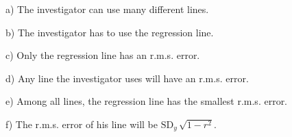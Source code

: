 \documentclass[10pt]{article}
\begin{document}
\hspace{20pt} a) The investigator can use many different lines.
\bigskip
 
\hspace{20pt} b) The investigator has to use the regression line.
\bigskip

\hspace{20pt} c) Only the regression line has an r.m.s. error.
\bigskip

\hspace{20pt} d) Any line the investigator uses will have an r.m.s. error.
\bigskip

\hspace{20pt} e) Among all lines, the regression line has the smallest r.m.s. error.
\bigskip

\hspace{20pt} f) The r.m.s. error of his line will be $\mbox{SD}_y\,\sqrt{1-r^2}$.
\bigskip
\eject
\end{document}
